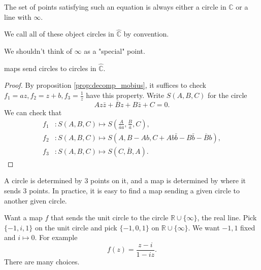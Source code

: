 \documentclass[a4paper]{article}
\begin{document}
      \begin{exercise}
          The set of points satisfying such an equation is always either a circle in $\mathbb{C}$ or a line with $ \infty $.
      \end{exercise}

      We call all of these object circles in $ \hat{\mathbb{C}} $ by convention.
      \begin{remark}
          We shouldn't think of $\infty$ as a "special" point.
      \end{remark}

      \begin{theorem}\label{thm:6.8}
          \mobius maps send circles to circles in $ \hat{\mathbb{C}} $.
      \end{theorem}
      \begin{proof}
          By proposition \ref{prop:decomp_mobius}, it suffices to check $ f_1=az,f_2=z+b,f_3=\frac{1}{z} $ have this property. Write $S(A,B,C)$ for the circle 
          \[
             Az \bar{z}+ \overline{B}z+B \bar{z}+C=0. %
          \]
          We can check that 
          \begin{align*}
              f_1&: S(A,B,C)\mapsto S\left( \frac{A}{\bar{a}a},\frac{B}{\bar{a}},C \right),\\
              f_2&: S(A,B,C)\mapsto S(A,B-Ab,C+Ab \bar{b}-B \bar{b}- \overline{B}b),\\
              f_3&: S(A,B,C) \mapsto S(C,\overline{B},A).
          \end{align*}
      \end{proof}
      \begin{remark}
          A circle is determined by 3 points on it, and a \mobius map is determined by where it sends 3 points. In practice, it is easy to find a \mobius map sending a given circle to another given circle.
      \end{remark}
      \begin{example}
          Want a \mobius map $f$ that sends the unit circle to the circle $ \mathbb{R} \cup \{\infty\} $, the real line. Pick $ \{-1,i,1\} $ on the unit circle and pick $ \{-1,0,1\} $ on $ \mathbb{R} \cup \{\infty \} $. We want $-1,1$ fixed and $ i \mapsto 0 $. For example 
          \[
              f(z)=\frac{z-i}{1-iz}.
          \]
          There are many choices.
      \end{example}
\end{document}
